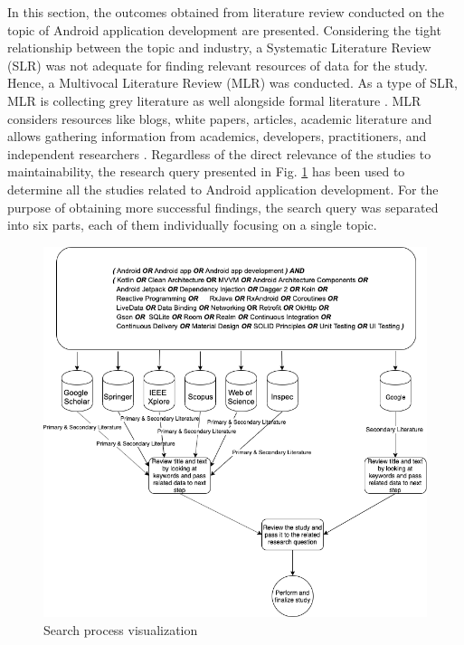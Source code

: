 In this section, the outcomes obtained from literature review conducted on the topic of Android application development are presented. Considering the tight relationship between the topic and industry, a Systematic Literature Review (SLR) was not adequate for finding relevant resources of data for the study. Hence, a Multivocal Literature Review (MLR) was conducted. As a type of SLR, MLR is collecting grey literature as well alongside formal literature \cite{40}. MLR considers resources like blogs, white papers, articles, academic literature and allows gathering information from academics, developers, practitioners, and independent researchers \cite{41}. Regardless of the direct relevance of the studies to maintainability, the research query presented in Fig. \ref{fig:lit_review_research_query} has been used to determine all the studies related to Android application development. For the purpose of obtaining more successful findings, the search query was separated into six parts, each of them individually focusing on a single topic.
\begin{figure}[ht!]
    \centering
    \includegraphics[scale=0.4]{figures/research_query.png}
    \caption{Search process visualization}
    \label{fig:lit_review_research_query}
\end{figure}
\FloatBarrier

